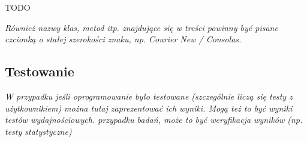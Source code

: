TODO

\textit{Również nazwy klas, metod itp. znajdujące się w treści powinny być pisane czcionką o stałej szerokości znaku, np. Courier New / Consolas. }

\subsection{Testowanie}
\textit{W przypadku jeśli oprogramowanie było testowane (szczególnie liczą się testy z użytkownikiem) można tutaj zaprezentować ich wyniki. Mogą też to być wyniki testów wydajnościowych. przypadku badań, może to być weryfikacja wyników (np. testy statystyczne)}